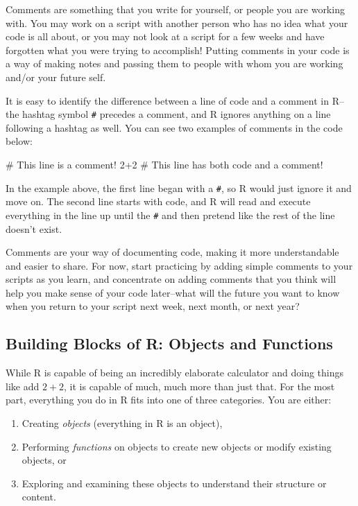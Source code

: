 \documentclass[
  letterpaper,
]{book}
\newenvironment{Shaded}{\begin{snugshade}}{\end{snugshade}}
\newcommand{\CommentTok}[1]{\textcolor[rgb]{0.37,0.37,0.37}{#1}}
\newcommand{\DecValTok}[1]{\textcolor[rgb]{0.68,0.00,0.00}{#1}}
\newcommand{\SpecialCharTok}[1]{\textcolor[rgb]{0.37,0.37,0.37}{#1}}
\providecommand{\tightlist}{%
  \setlength{\itemsep}{0pt}\setlength{\parskip}{0pt}}\usepackage{longtable,booktabs,array}
\begin{document}
Comments are something that you write for yourself, or people you are
working with. You may work on a script with another person who has no
idea what your code is all about, or you may not look at a script for a
few weeks and have forgotten what you were trying to accomplish! Putting
comments in your code is a way of making notes and passing them to
people with whom you are working and/or your future self.

It is easy to identify the difference between a line of code and a
comment in R--the hashtag symbol \texttt{\#} precedes a comment, and R
ignores anything on a line following a hashtag as well. You can see two
examples of comments in the code below:

\begin{Shaded}
\begin{Highlighting}[]
\CommentTok{\# This line is a comment!}
\DecValTok{2}\SpecialCharTok{+}\DecValTok{2} \CommentTok{\# This line has both code and a comment! }
\end{Highlighting}
\end{Shaded}

In the example above, the first line began with a \texttt{\#}, so R
would just ignore it and move on. The second line starts with code, and
R will read and execute everything in the line up until the \texttt{\#}
and then pretend like the rest of the line doesn't exist.

Comments are your way of documenting code, making it more understandable
and easier to share. For now, start practicing by adding simple comments
to your scripts as you learn, and concentrate on adding comments that
you think will help you make sense of your code later--what will the
future you want to know when you return to your script next week, next
month, or next year?

\subsection{Building Blocks of R: Objects and
Functions}\label{building-blocks-of-r-objects-and-functions}

While R is capable of being an incredibly elaborate calculator and doing
things like add \(2+2\), it is capable of much, much more than just
that. For the most part, everything you do in R fits into one of three
categories. You are either:

\begin{enumerate}
\def\labelenumi{\arabic{enumi}.}
\tightlist
\item
  Creating \emph{objects} (everything in R is an object),
\item
  Performing \emph{functions} on objects to create new objects or modify
  existing objects, or
\item
  Exploring and examining these objects to understand their structure or
  content.
\end{enumerate}
\end{document}
